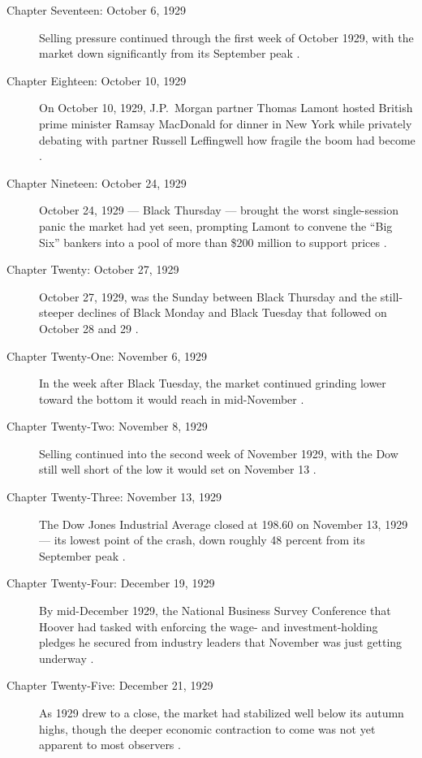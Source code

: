 \documentclass[11pt]{article}
\begin{document}
\begin{description}
\item[Chapter Seventeen: October 6, 1929] Selling pressure continued through
the first week of October 1929, with the market down significantly from its
September peak \autocite{crashwiki}.

\item[Chapter Eighteen: October 10, 1929] On October 10, 1929, J.P.\ Morgan
partner Thomas Lamont hosted British prime minister Ramsay MacDonald for
dinner in New York while privately debating with partner Russell Leffingwell
how fragile the boom had become \autocite{supersummaryCh18to25}.

\item[Chapter Nineteen: October 24, 1929] October 24, 1929 --- Black Thursday
--- brought the worst single-session panic the market had yet seen, prompting
Lamont to convene the ``Big Six'' bankers into a pool of more than \$200
million to support prices \autocite{supersummaryCh18to25}.

\item[Chapter Twenty: October 27, 1929] October 27, 1929, was the Sunday
between Black Thursday and the still-steeper declines of Black Monday and
Black Tuesday that followed on October 28 and 29 \autocite{crashwiki}.

\item[Chapter Twenty-One: November 6, 1929] In the week after Black Tuesday,
the market continued grinding lower toward the bottom it would reach in
mid-November \autocite{crashwiki}.

\item[Chapter Twenty-Two: November 8, 1929] Selling continued into the second
week of November 1929, with the Dow still well short of the low it would set
on November 13 \autocite{crashwiki}.

\item[Chapter Twenty-Three: November 13, 1929] The Dow Jones Industrial
Average closed at 198.60 on November 13, 1929 --- its lowest point of the
crash, down roughly 48 percent from its September peak \autocite{crashwiki}.

\item[Chapter Twenty-Four: December 19, 1929] By mid-December 1929, the
National Business Survey Conference that Hoover had tasked with enforcing the
wage- and investment-holding pledges he secured from industry leaders that
November was just getting underway \autocite{hooverconferences1929}.

\item[Chapter Twenty-Five: December 21, 1929] As 1929 drew to a close, the
market had stabilized well below its autumn highs, though the deeper economic
contraction to come was not yet apparent to most observers \autocite{crashwiki}.

\end{description}
\end{document}
